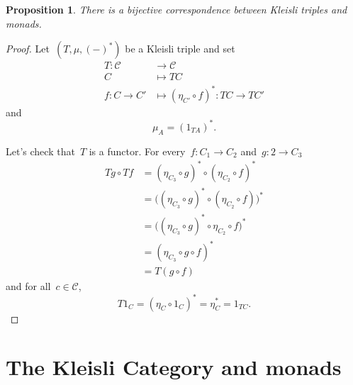 \documentclass[a4paper]{article}
\theoremstyle{plain}
\newtheorem{proposition}[theorem]{Proposition}
\theoremstyle{definition}
\newcommand{\cat}[1]{\mathcal{#1}}
\begin{document}
\begin{proposition}
    There is a bijective correspondence between Kleisli triples and monads.
\end{proposition}
\begin{proof}
    Let~\((T, \mu, (-)^{\ast})\) be a Kleisli triple
    and set
    \begin{align*}
        T:\cat{C} & \longrightarrow\cat{C} \\
        C & \longmapsto TC \\
        f:C\rightarrow C' & \longmapsto
        (\eta_{C'}\circ f)^{\ast}:TC\longrightarrow TC'
    \end{align*}
    and
    \[
        \mu_{A} = (1_{TA})^{\ast}.
    \]

    Let's check that~\(T\) is a functor.
    For every~\(f:C_{1}\longrightarrow C_{2}\)
    and~\(g:{2}\longrightarrow C_{3}\)
    \begin{align*}
        Tg\circ Tf &= (\eta_{C_{3}}\circ g)^{\ast}\circ
                      (\eta_{C_{2}}\circ f)^{\ast} \\
                   &= \bigl((\eta_{C_{3}}\circ g)^{\ast}\circ
                      (\eta_{C_{2}}\circ f)\bigr)^{\ast} \\
                   &= \bigl((\eta_{C_{3}}\circ g)^{\ast}\circ
                      \eta_{C_{2}}\circ f\bigr)^{\ast} \\
                   &= (\eta_{C_{3}}\circ g\circ f)^{\ast} \\
                   &= T(g\circ f)
    \end{align*}
    and for all~\(c\in\cat{C}\),
    \[
        T1_{C} = (\eta_{C}\circ 1_{C})^{\ast} = \eta_{C}^{\ast} = 1_{TC}.
    \]
\end{proof}

\section{The Kleisli Category and monads}
\end{document}
